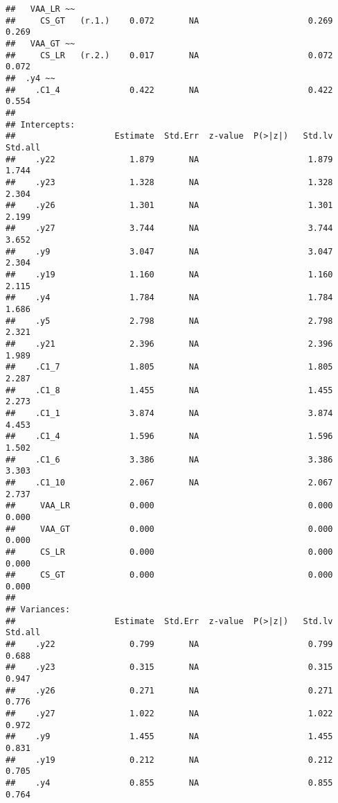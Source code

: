 \documentclass[
]{article}
\begin{document}
\begin{verbatim}
##   VAA_LR ~~                                                             
##     CS_GT   (r.1.)    0.072       NA                      0.269    0.269
##   VAA_GT ~~                                                             
##     CS_LR   (r.2.)    0.017       NA                      0.072    0.072
##  .y4 ~~                                                                 
##    .C1_4              0.422       NA                      0.422    0.554
## 
## Intercepts:
##                    Estimate  Std.Err  z-value  P(>|z|)   Std.lv  Std.all
##    .y22               1.879       NA                      1.879    1.744
##    .y23               1.328       NA                      1.328    2.304
##    .y26               1.301       NA                      1.301    2.199
##    .y27               3.744       NA                      3.744    3.652
##    .y9                3.047       NA                      3.047    2.304
##    .y19               1.160       NA                      1.160    2.115
##    .y4                1.784       NA                      1.784    1.686
##    .y5                2.798       NA                      2.798    2.321
##    .y21               2.396       NA                      2.396    1.989
##    .C1_7              1.805       NA                      1.805    2.287
##    .C1_8              1.455       NA                      1.455    2.273
##    .C1_1              3.874       NA                      3.874    4.453
##    .C1_4              1.596       NA                      1.596    1.502
##    .C1_6              3.386       NA                      3.386    3.303
##    .C1_10             2.067       NA                      2.067    2.737
##     VAA_LR            0.000                               0.000    0.000
##     VAA_GT            0.000                               0.000    0.000
##     CS_LR             0.000                               0.000    0.000
##     CS_GT             0.000                               0.000    0.000
## 
## Variances:
##                    Estimate  Std.Err  z-value  P(>|z|)   Std.lv  Std.all
##    .y22               0.799       NA                      0.799    0.688
##    .y23               0.315       NA                      0.315    0.947
##    .y26               0.271       NA                      0.271    0.776
##    .y27               1.022       NA                      1.022    0.972
##    .y9                1.455       NA                      1.455    0.831
##    .y19               0.212       NA                      0.212    0.705
##    .y4                0.855       NA                      0.855    0.764

\end{verbatim}
\end{document}
